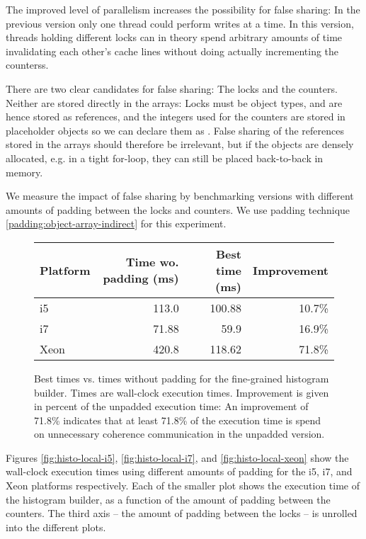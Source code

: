 The improved level of parallelism increases the possibility for false sharing: In
the previous version only one thread could perform writes at a time. In this
version, threads holding different locks can in theory spend arbitrary amounts
of time invalidating each other's cache lines without doing actually
incrementing the counterss.

There are two clear candidates for false sharing: The locks and the counters.
Neither are stored directly in the arrays: Locks must be object types, and are
hence stored as references, and the integers used for the counters are stored in
placeholder objects so we can declare them as . False sharing of
the references stored in the arrays should therefore be irrelevant, but if the
objects are densely allocated, e.g. in a tight for-loop, they can still be
placed back-to-back in memory.

We measure the impact of false sharing by benchmarking versions with different
amounts of padding between the locks and counters. We use padding technique
\ref{padding:object-array-indirect} for this experiment.

\begin{figure}[hbtp]
	\centering
	\begin{tabular}{l r r r}
		\hline
		\hline
		Platform & Time wo. padding (ms) & Best time (ms) & Improvement \\
		\hline
		i5 & 113.0 & 100.88 & 10.7\% \\
		i7 & 71.88 & 59.9 & 16.9\% \\
		Xeon & 420.8 & 118.62 & 71.8\% \\
		\hline
		\hline
	\end{tabular}
	\caption{Best times vs. times without padding for the fine-grained
	histogram builder. Times are wall-clock execution times. Improvement is
	given in percent of the unpadded execution time: An improvement of
	71.8\% indicates that at least 71.8\% of the execution time is spend on
	unnecessary coherence communication in the unpadded version.}
	\label{table:hist-local}
\end{figure}

Figures \ref{fig:histo-local-i5}, \ref{fig:histo-local-i7}, and
\ref{fig:histo-local-xeon} show the wall-clock execution times using different
amounts of padding for the i5, i7, and Xeon platforms respectively. Each of the smaller
plot shows the execution time of the histogram builder, as a function of the
amount of padding between the counters. The third axis -- the amount of padding
between the locks -- is unrolled into the different plots.

